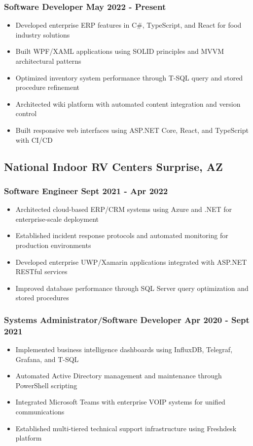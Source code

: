 \documentclass[11pt]{article} %
\begin{document}
\subsubsection{Software Developer \hfill May 2022 - Present}
\begin{itemize}
    \item Developed enterprise ERP features in C\#, TypeScript, and React for food industry solutions
    \item Built WPF/XAML applications using SOLID principles and MVVM architectural patterns
    \item Optimized inventory system performance through T-SQL query and stored procedure refinement
    \item Architected wiki platform with automated content integration and version control
    \item Built responsive web interfaces using ASP.NET Core, React, and TypeScript with CI/CD
\end{itemize}

\subsection{National Indoor RV Centers \hfill Surprise, AZ}
\subsubsection{Software Engineer \hfill Sept 2021 - Apr 2022}
\begin{itemize}
	\item Architected cloud-based ERP/CRM systems using Azure and .NET for enterprise-scale deployment
	\item Established incident response protocols and automated monitoring for production environments
	\item Developed enterprise UWP/Xamarin applications integrated with ASP.NET RESTful services
	\item Improved database performance through SQL Server query optimization and stored procedures
	\end{itemize}
	
	\subsubsection{Systems Administrator/Software Developer \hfill Apr 2020 - Sept 2021}
	\begin{itemize}
	\item Implemented business intelligence dashboards using InfluxDB, Telegraf, Grafana, and T-SQL
	\item Automated Active Directory management and maintenance through PowerShell scripting
	\item Integrated Microsoft Teams with enterprise VOIP systems for unified communications
	\item Established multi-tiered technical support infrastructure using Freshdesk platform
\end{itemize}
\end{document}
